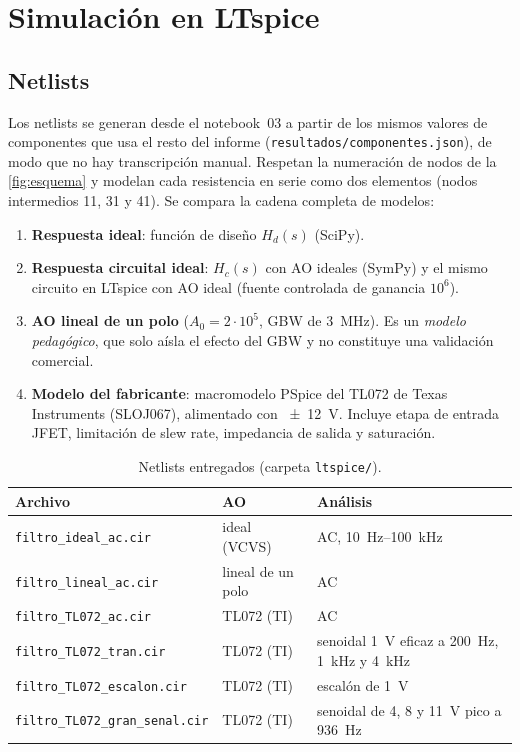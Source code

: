 \section{Simulación en LTspice}
\label{sec:ltspice}

\subsection{Netlists}
Los netlists se generan desde el notebook~03 a partir de los mismos valores de componentes que usa el resto del informe
(\texttt{resultados/componentes.json}), de modo que no hay transcripción manual. Respetan la numeración de nodos de la \cref{fig:esquema} y modelan
cada resistencia en serie como dos elementos (nodos intermedios 11, 31 y 41). Se compara la cadena completa de modelos:
\begin{enumerate}
  \item \textbf{Respuesta ideal}: función de diseño $H_d(s)$ (SciPy).
  \item \textbf{Respuesta circuital ideal}: $H_c(s)$ con AO ideales (SymPy) y el mismo circuito en LTspice con AO ideal (fuente controlada de
        ganancia $10^6$).
  \item \textbf{AO lineal de un polo} ($A_0 = 2\cdot10^5$, GBW de \qty{3}{\mega\hertz}). Es un \emph{modelo pedagógico}, que solo aísla el efecto
        del GBW y no constituye una validación comercial.
  \item \textbf{Modelo del fabricante}: macromodelo PSpice del TL072 de Texas Instruments (SLOJ067), alimentado con \qty{\pm 12}{\volt}. Incluye
        etapa de entrada JFET, limitación de slew rate, impedancia de salida y saturación.
\end{enumerate}

\begin{table}[H]
  \centering\small
  \caption{Netlists entregados (carpeta \texttt{ltspice/}).}
  \label{tab:netlists}
  \begin{tabular}{@{}lll@{}}
    \toprule
    Archivo & AO & Análisis \\
    \midrule
    \texttt{filtro\_ideal\_ac.cir}       & ideal (VCVS)            & AC, \qty{10}{\hertz}--\qty{100}{\kilo\hertz} \\
    \texttt{filtro\_lineal\_ac.cir}      & lineal de un polo       & AC \\
    \texttt{filtro\_TL072\_ac.cir}       & TL072 (TI)              & AC \\
    \texttt{filtro\_TL072\_tran.cir}     & TL072 (TI)              & senoidal \qty{1}{\volt} eficaz a \qty{200}{\hertz}, \qty{1}{\kilo\hertz} y \qty{4}{\kilo\hertz} \\
    \texttt{filtro\_TL072\_escalon.cir}  & TL072 (TI)              & escalón de \qty{1}{\volt} \\
    \texttt{filtro\_TL072\_gran\_senal.cir} & TL072 (TI)           & senoidal de 4, 8 y \qty{11}{\volt} pico a \qty{936}{\hertz} \\
    \bottomrule
  \end{tabular}
\end{table}

